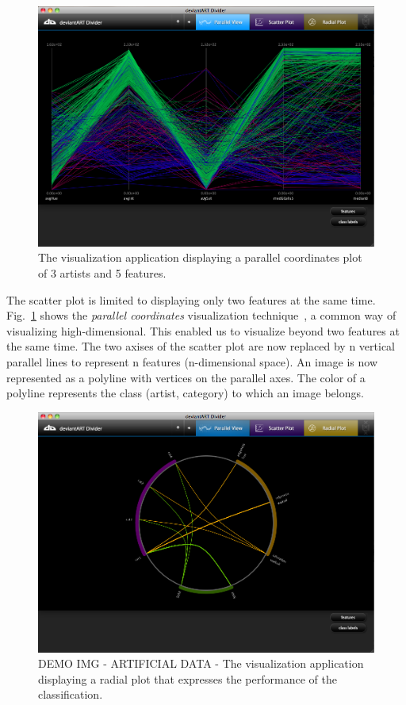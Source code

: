 \begin{figure}[htb]
  \centering
  \includegraphics[width=1\linewidth]{img/visualization_parallel.png}
  \caption{The visualization application displaying a parallel coordinates plot of 3 artists and 5 features.}
  \label{fig:visualization_parallel}
\end{figure}

The scatter plot is limited to displaying only two features at the same time.
Fig.~\ref{fig:visualization_parallel} shows the \textit{parallel coordinates} visualization technique~\cite{andrienko2001constructing}, a common way of visualizing high-dimensional.
This enabled us to visualize beyond two features at the same time.
The two axises of the scatter plot are now replaced by n vertical parallel lines to represent n features (n-dimensional space).
An image is now represented as a polyline with vertices on the parallel axes.
The color of a polyline represents the class (artist, category) to which an image belongs.

\begin{figure}[htb]
  \centering
  \includegraphics[width=1\linewidth]{img/visualization_radial.png}
  \caption{DEMO IMG - ARTIFICIAL DATA - The visualization application displaying a radial plot that expresses the performance of the classification.}
  \label{fig:visualization_radial}
\end{figure}

